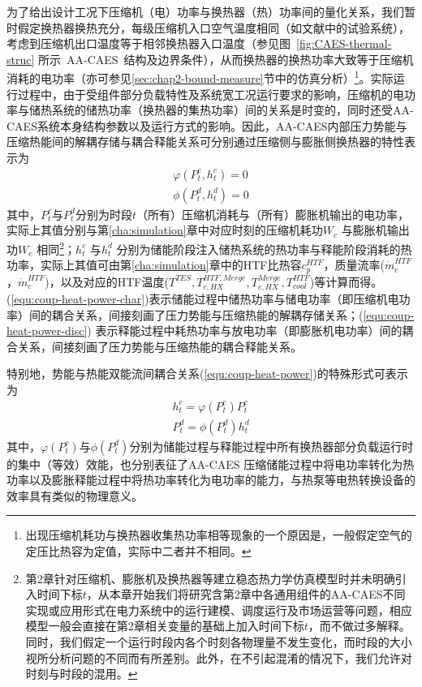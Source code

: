 为了给出设计工况下压缩机（电）功率与换热器（热）功率间的量化关系，我们暂时假定换热器换热充分，每级压缩机入口空气温度相同（如文献中的试验系统），考虑到压缩机出口温度等于相邻换热器入口温度（参见图~\ref{fig:CAES-thermal-struc} 所示~AA-CAES~结构及边界条件），从而换热器的换热功率大致等于压缩机消耗的电功率（亦可参见\ref{sec:chap2-bound-measure}节中的仿真分析）\footnote{出现压缩机耗功与换热器收集热功率相等现象的一个原因是，一般假定空气的定压比热容为定值，实际中二者并不相同。}。实际运行过程中，由于受组件部分负载特性及系统宽工况运行要求的影响，压缩机的电功率与储热系统的储热功率（换热器的集热功率）间的关系是时变的，同时还受AA-CAES系统本身结构参数以及运行方式的影响。因此，AA-CAES内部压力势能与压缩热能间的解耦存储与耦合释能关系可分别通过压缩侧与膨胀侧换热器的特性表示为
\begin{subequations}
\label{equ:coup-heat-power}
\begin{gather}
\varphi ({P_t^c,h_t^c}) = 0 \label{equ:coup-heat-power-char}\\
\phi ({P_t^d,h_t^d}) = 0 \label{equ:coup-heat-power-disc}
\end{gather}
\end{subequations}
其中，$P_t^c$与$P_t^d$分别为时段$t$（所有）压缩机消耗与（所有）膨胀机输出的电功率，实际上其值分别与第\ref{cha:simulation}章中对应时刻的压缩机耗功$W_{c}$ 与膨胀机输出功$W_{e}$ 相同\footnote{第2章针对压缩机、膨胀机及换热器等建立稳态热力学仿真模型时并未明确引入时间下标$t$，从本章开始我们将研究含第2章中各通用组件的AA-CAES不同实现或应用形式在电力系统中的运行建模、调度运行及市场运营等问题，相应模型一般会直接在第2章相关变量的基础上加入时间下标$t$，而不做过多解释。 同时，我们假定一个运行时段内各个时刻各物理量不发生变化，而时段的大小视所分析问题的不同而有所差别。此外，在不引起混淆的情况下，我们允许对时刻与时段的混用。}；$h_t^c$ 与$h_t^d$ 分别为储能阶段注入储热系统的热功率与释能阶段消耗的热功率，实际上其值可由第\ref{cha:simulation}章中的HTF比热容$c_p^{HTF}$，质量流率($\dot m_e^{HTF}$，$\dot m_c^{HTF}$)，以及对应的HTF温度($T^{TES}, T_{c,HX}^{HTF, Merge}, T_{e,HX}^{Merge},T_{cool}^{HTF}$)等计算而得。(\ref{equ:coup-heat-power-char})表示储能过程中储热功率与储电功率（即压缩机电功率）间的耦合关系，间接刻画了压力势能与压缩热能的解耦存储关系；(\ref{equ:coup-heat-power-disc}) 表示释能过程中耗热功率与放电功率（即膨胀机电功率）间的耦合关系，间接刻画了压力势能与压缩热能的耦合释能关系。

特别地，势能与热能双能流间耦合关系(\ref{equ:coup-heat-power})的特殊形式可表示为
\begin{subequations}
\label{equ:coup-heat-power-spe}
\begin{gather}
h_t^c = \varphi ({P_t^c})P_t^c \label{equ:coup-heat-power-char-spe}\\
P_t^d = \phi ({P_t^d})h_t^d  \label{equ:coup-heat-power-disc-spe}
\end{gather}
\end{subequations}
其中，$\varphi ({P_t^c})$与$\phi ({P_t^d})$分别为储能过程与释能过程中所有换热器部分负载运行时的集中（等效）效能，也分别表征了AA-CAES 压缩储能过程中将电功率转化为热功率以及膨胀释能过程中将热功率转化为电功率的能力，与热泵等电热转换设备的效率具有类似的物理意义。

